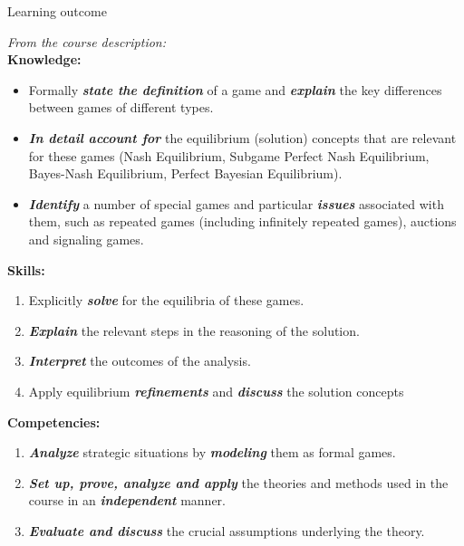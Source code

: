 \begin{frame}{Learning outcome}
\begin{multicols}{2}
  \color{lightgray}
  \textit{From the course description:}
  \\\medskip
  \textbf{Knowledge:}
  \begin{itemize}\color{lightgray}
    \item[\textcolor{lightgray}{1.}] Formally \textit{\textbf{state the definition}} of a game and \textit{\textbf{explain}} the key differences between games of different types.
    \item[\textcolor{lightgray}{2.}] \textit{\textbf{In detail account for}} the equilibrium (solution) concepts that are relevant for these games (Nash Equilibrium, Subgame Perfect Nash Equilibrium, Bayes-Nash Equilibrium, Perfect Bayesian Equilibrium).
    \item[\textcolor{lightgray}{3.}] \textit{\textbf{Identify}} a number of special games and particular \textit{\textbf{issues}} associated with them, such as repeated games (including infinitely repeated games), auctions and signaling games.
  \end{itemize}
\columnbreak\color{black}
\textbf{Skills:}
\begin{enumerate}
  \item Explicitly \textit{\textbf{solve}} for the equilibria of these games.
  \item \textit{\textbf{Explain}} the relevant steps in the reasoning of the solution.
  \item \textit{\textbf{Interpret}} the outcomes of the analysis.
  \item Apply equilibrium \textit{\textbf{refinements}} and \textit{\textbf{discuss}} the solution concepts
\end{enumerate}
\textbf{Competencies:}
\begin{enumerate}
  \item \textit{\textbf{Analyze}} strategic situations by \textit{\textbf{modeling}} them as formal games.
  \item \textit{\textbf{Set up, prove, analyze and apply}} the theories and methods used in the course in an \textit{\textbf{independent}} manner.
  \item \textit{\textbf{Evaluate and discuss}} the crucial assumptions underlying the theory.
\end{enumerate}
\end{multicols}
\end{frame}


